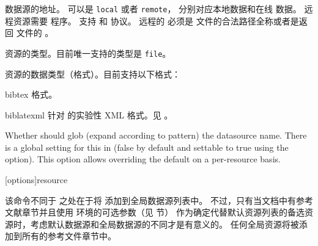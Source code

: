 \begin{ltxsyntax}
\begin{optionlist*}
数据源的地址。
 可以是 \texttt{local} 或者 \texttt{remote}，
分别对应本地数据和在线  数据。
远程资源需要 \biber{} 程序。
支持  和  协议。
远程的  必须是  文件的合法路径全称或者是返回  文件的 。



资源的类型。目前唯一支持的类型是 \texttt{file}。



资源的数据类型（格式）。目前支持以下格式：

\begin{valuelist}[zoterordfxml]

\item[bibtex] %
\BibTeX 格式。

\item[biblatexml] %
针对 \biblatex 的实验性 XML 格式。见 。

\end{valuelist}


Whether \biber should glob (expand according to pattern) the datasource name. There is
a global setting for this in \biber (false by default and settable to true
using the  option). This option allows overriding
the \biber default on a per-resource basis.
\end{optionlist*}


[options]{resource}


该命令不同于  之处在于将  添加到全局数据源列表中。
不过，只有当文档中有参考文献章节并且使用  环境的可选参数（见  节）
作为确定代替默认资源列表的备选资源时，考虑默认数据源和全局数据源的不同才是有意义的。
任何全局资源将被添加到所有的参考文件章节中。


\end{ltxsyntax}
